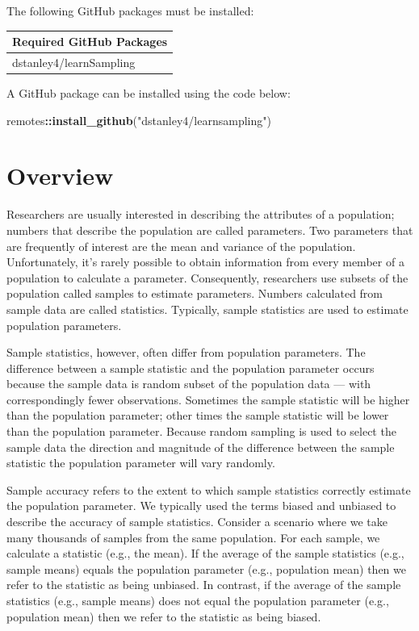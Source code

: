 \documentclass[
]{krantz}
\makeatletter
\newenvironment{Shaded}{\begin{snugshade}}{\end{snugshade}}
\newcommand{\KeywordTok}[1]{\textcolor[rgb]{0.27,0.27,0.27}{\textbf{#1}}}
\newcommand{\NormalTok}[1]{#1}
\newcommand{\OperatorTok}[1]{\textcolor[rgb]{0.43,0.43,0.43}{\textbf{#1}}}
\newcommand{\StringTok}[1]{\textcolor[rgb]{0.5,0.5,0.5}{#1}}
\newenvironment{kframe}{%
\medskip{}
\setlength{\fboxsep}{.8em}
 \def\at@end@of@kframe{}%
 \ifinner\ifhmode%
  \def\at@end@of@kframe{\end{minipage}}%
  \begin{minipage}{\columnwidth}%
 \fi\fi%
 \def\FrameCommand##1{\hskip\@totalleftmargin \hskip-\fboxsep
 \colorbox{shadecolor}{##1}\hskip-\fboxsep
     \hskip-\linewidth \hskip-\@totalleftmargin \hskip\columnwidth}%
 \MakeFramed {\advance\hsize-\width
   \@totalleftmargin\z@ \linewidth\hsize
   \@setminipage}}%
 {\par\unskip\endMakeFramed%
 \at@end@of@kframe}
\renewenvironment{Shaded}{\begin{kframe}}{\end{kframe}}
\makeatother
\begin{document}
The following GitHub packages must be installed:

\begin{longtable}[]{@{}l@{}}
\toprule
Required GitHub Packages\tabularnewline
\midrule
\endhead
dstanley4/learnSampling\tabularnewline
\bottomrule
\end{longtable}

A GitHub package can be installed using the code below:

\begin{Shaded}
\begin{Highlighting}[]
\NormalTok{remotes}\OperatorTok{::}\KeywordTok{install_github}\NormalTok{(}\StringTok{"dstanley4/learnsampling"}\NormalTok{)}
\end{Highlighting}
\end{Shaded}

\hypertarget{overview}{%
\section{Overview}\label{overview}}

Researchers are usually interested in describing the attributes of a population; numbers that describe the population are called parameters. Two parameters that are frequently of interest are the mean and variance of the population. Unfortunately, it's rarely possible to obtain information from every member of a population to calculate a parameter. Consequently, researchers use subsets of the population called samples to estimate parameters. Numbers calculated from sample data are called statistics. Typically, sample statistics are used to estimate population parameters.

Sample statistics, however, often differ from population parameters. The difference between a sample statistic and the population parameter occurs because the sample data is random subset of the population data --- with correspondingly fewer observations. Sometimes the sample statistic will be higher than the population parameter; other times the sample statistic will be lower than the population parameter. Because random sampling is used to select the sample data the direction and magnitude of the difference between the sample statistic the population parameter will vary randomly.

Sample accuracy refers to the extent to which sample statistics correctly estimate the population parameter. We typically used the terms biased and unbiased to describe the accuracy of sample statistics. Consider a scenario where we take many thousands of samples from the same population. For each sample, we calculate a statistic (e.g., the mean). If the average of the sample statistics (e.g., sample means) equals the population parameter (e.g., population mean) then we refer to the statistic as being unbiased. In contrast, if the average of the sample statistics (e.g., sample means) does not equal the population parameter (e.g., population mean) then we refer to the statistic as being biased.
\end{document}
